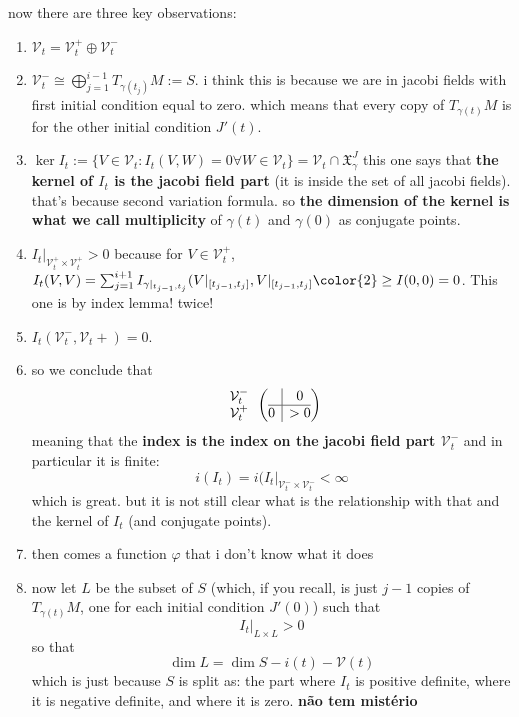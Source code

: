 now there are three key observations:
\begin{enumerate}
\item \(\mathcal{V}_t=\mathcal{V}_t^+ \oplus  \mathcal{V}_t^-\)
\item \(\mathcal{V}_t^- \cong \bigoplus_{j=1}^{i-1}T_{\gamma(t_j)}M:=S\). {\color{2}i think} this is because we are in jacobi fields with first initial condition equal to zero. which means that every copy of \(T_{\gamma(t)}M\) is for the other initial condition \(J'(t)\).
\item \(\ker I_t:=\{V \in \mathcal{V}_t:I_t(V,W)=0 \forall W \in \mathcal{V}_t\}=\mathcal{V}_t \cap \mathfrak{X}_\gamma^J\)
this one says that \textbf{the kernel of \(I_t\) is the jacobi field part} (it is inside the set of all jacobi fields). that's because second variation formula. so \textbf{the dimension of the kernel is what we call multiplicity} of \(\gamma(t)\) and \(\gamma(0)\) as conjugate points.
\item \(I_t|_{\mathcal{V}^+_t \times \mathcal{V}^+_t}>0\) because for \(V \in \mathcal{V}^+_t\), \(I_t(V,V)=\sum_{j=1}^{i+1}I_{\gamma|_{t_{j-1},t_j}}(V|_{[t_{j-1},t_j]},V|_{[t_{j-1},t_j]}{\color{2}\geq I(0,0)=0}\). This one is by index lemma! twice!
\item \(I_{t}(\mathcal{V}_t^-,\mathcal{V}_t+)=0\).
\item so we conclude that
	\[\begin{array}{c}
	\mathcal{V}_t^-\\
	 \mathcal{V}_t^+\end{array}\left(\begin{array}{@{}c|c@{}}
	&0\\
	\hline
	0&>0\end{array}\right)\]
meaning that the \textbf{index is the index on the jacobi field part \(\mathcal{V}^-_t\)} and in particular it is finite:
\[i(I_t)=i(I_t|_{\mathcal{V}_t^- \times \mathcal{V}_t^-}<\infty\]
which is great. but it is not still clear what is the relationship with that and the kernel of \(I_t\) (and conjugate points).
\item then comes a function \(\varphi\) that i don't know what it does
\item now let \(L\) be the subset of \(S\) (which, if you recall, is just \(j-1\) copies of  \(T_{\gamma(t)}M\), one for each initial condition \(J'(0)\)) such that
	 \[I_{t}|_{L \times L}>0\]
so that
\[\dim L=\dim S-i(t)-\mathcal{V}(t)\]
which is just because \(S\) is split as: the part where \(I_t\) is positive definite, where it is negative definite, and where it is zero. \textbf{não tem mistério}

\end{enumerate}
